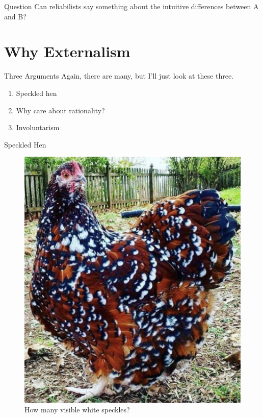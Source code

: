 \documentclass[
  17pt,
  letterpaper,
  ignorenonframetext,
  aspectratio=169,
]{beamer}
\providecommand{\tightlist}{%
  \setlength{\itemsep}{0pt}\setlength{\parskip}{0pt}}\usepackage{longtable,booktabs,array}
\begin{document}
\begin{frame}{Question}
\protect\hypertarget{question-1}{}
Can reliabilists say something about the intuitive differences between A
and B?
\end{frame}

\hypertarget{why-externalism}{%
\section{Why Externalism}\label{why-externalism}}

\begin{frame}{Three Arguments}
\protect\hypertarget{three-arguments}{}
Again, there are many, but I'll just look at these three.

\begin{enumerate}[<+->]
\tightlist
\item
  Speckled hen
\item
  Why care about rationality?
\item
  Involuntarism
\end{enumerate}
\end{frame}

\begin{frame}{Speckled Hen}
\protect\hypertarget{speckled-hen}{}
\begin{figure}

{\centering \includegraphics[width=\textwidth,height=0.6\textheight]{../images/hen.jpg}

}

\caption{How many visible white speckles?}

\end{figure}
\end{frame}
\end{document}
